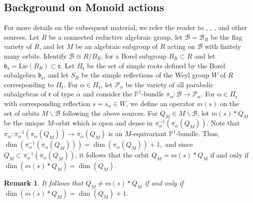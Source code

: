 \documentclass[12pt]{amsart}
\numberwithin{equation}{section}
\newtheorem{rem}[thm]{Remark}
\newcommand{\fr}{\mbox{${\mathfrak r}$}}
\newcommand{\fb}{\mbox{${\mathfrak b}$}}
\newcommand{\B}{\mathcal{B}}
\newcommand{\Borbitspace}{B_{n-1}\backslash\B_{n}}
\begin{document}
\subsection{Background on Monoid actions}\label{ss:monoidbackground}
For more details on the subsequent material, we refer the reader to \cite{RS}, \cite{Vg}, \cite{CEexp}, \cite{CE21I} and other sources.
Let $R$ be a connected reductive algebraic group, let $\B=\B_{R}$ be the flag 
variety of $R$, and let $M$ be an algebraic subgroup of $R$ acting on $\B$ with finitely many orbits.  Identify $\B \cong R/B_{R}$, for a Borel subgroup $B_{R}\subset R$ and let $\fb_{\fr}=\mbox{Lie}(B_{R})\subset\fr$.  
Let $\Pi_{\fr}$ be the set of simple roots defined by the Borel subalgebra $\fb_{\fr}$, and let $S_{R}$ be the simple reflections of the Weyl group $W$ of $R$ corresponding to $\Pi_{\fr}$.  For $\alpha\in \Pi_{\fr}$, let $\mathcal{P}_{\alpha}$ be the variety of all parabolic subalgebras of $\fr$ of type $\alpha$ and consider the $\mathbb{P}^{1}$-bundle $\pi_{\alpha}:\B \to {\mathcal{P}}_{\alpha}$.  %
For $\alpha \in \Pi_{\fr}$ with corresponding reflection $s=s_{\alpha} \in W$, we define an operator $m(s)$ on the set of orbits $M\backslash \B$ following the above sources.  For $Q_M \in M\backslash \B$, let $m(s)*Q_{M}$ be the unique $M$-orbit which is open and dense in $\pi_{\alpha}^{-1}(\pi_{\alpha}(Q_{M})).$   Note that $\pi_{\alpha}: \pi_{\alpha}^{-1}(\pi_{\alpha}(Q_{M}))\to \pi_{\alpha}(Q_{M})$ is an $M$-equivariant 
$\mathbb{P}^{1}$-bundle. Thus, $\dim(\pi_{\alpha}^{-1}(\pi_{\alpha}(Q_{M})))=\dim(\pi_{\alpha}(Q_{M}))+1,$ and since $Q_M \subset \pi_{\alpha}^{-1}(\pi_{\alpha}(Q_{M}))$, it follows that the orbit $Q_{M} = m(s)*Q_{M}$ if and only if $\dim(m(s)*Q_{M})=\dim(Q_{M}).$

\begin{rem}\label{r:monoidmove}
It follows that  $Q_{M} \not= m(s)*Q_{M}$ if and only if $\dim(m(s)*Q_{M})=\dim(Q_{M})+1.$
\end{rem}
\end{document}
